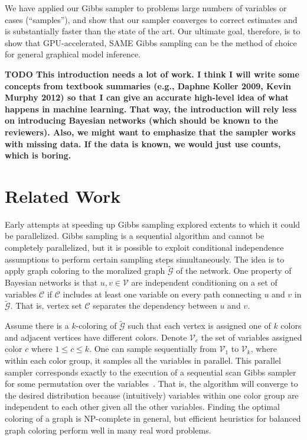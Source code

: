 \documentclass{article} %
\begin{document}
We have applied our Gibbs sampler to problems large numbers of variables or cases (``samples''), and
show that our sampler converges to correct estimates and is substantially faster than the state of
the art. Our ultimate goal, therefore, is to show that GPU-accelerated, SAME Gibbs sampling can be
the method of choice for general graphical model inference.

\textbf{TODO This introduction needs a lot of work. I think I will write some concepts from textbook
summaries (e.g., Daphne Koller 2009, Kevin Murphy 2012) so that I can give an accurate high-level
idea of what happens in machine learning. That way, the introduction will rely less on introducing
Bayesian networks (which should be known to the reviewers). Also, we might want to emphasize that
the sampler works with missing data. If the data is known, we would just use counts, which is
boring.}




\section{Related Work}\label{sec:related_work}

Early attempts at speeding up Gibbs sampling explored extents to which it could be parallelized.
Gibbs sampling is a sequential algorithm and cannot be completely parallelized, but it is possible
to exploit conditional independence assumptions to perform certain sampling steps simultaneously.
The idea is to apply graph coloring to the moralized graph  $\tilde{\mathcal{G}}$ of the network.
One property of Bayesian networks is that $u, v \in \mathcal{V}$ are independent conditioning on a
set of variables $\mathcal{C}$ if $\mathcal{C}$ includes at least one variable on every path
connecting $u$ and $v$ in $\tilde{\mathcal{G}}$. That is, vertex set $\mathcal{C}$ separates the
dependency between $u$ and $v$.

Assume there is a $k$-coloring of $\tilde{\mathcal{G}}$ such that each vertex is assigned one of $k$
colors and adjacent vertices have different colors. Denote $\mathcal{V}_c$ the set of variables
assigned color $c$ where $1 \leq c \leq k$. One can sample sequentially from $\mathcal{V}_1$
to $\mathcal{V}_k$, where within each color group, it samples all the variables in parallel. This
parallel sampler corresponds exactly to the execution of a sequential scan Gibbs sampler for some
permutation over the variables~\citep{Gonzalez2011}. That is, the algorithm will converge to the
desired distribution because (intuitively) variables within one color group are independent to each
other given all the other variables. Finding the optimal coloring of a graph is NP-complete in
general, but efficient heuristics for balanced graph coloring perform well in many real word
problems.
\end{document}
